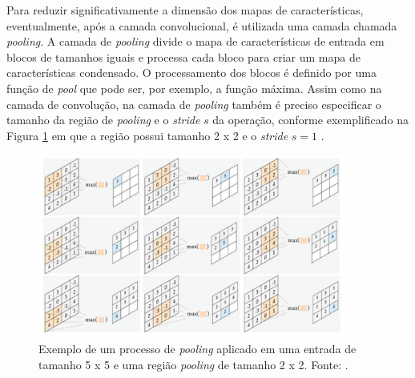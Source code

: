Para reduzir significativamente a dimensão dos mapas de características, eventualmente, após a camada convolucional, é utilizada uma camada chamada \textit{pooling}. A camada de \textit{pooling} divide o mapa de características de entrada em blocos de tamanhos iguais e processa cada bloco para criar um mapa de características condensado. O processamento dos blocos é definido por uma função de \textit{pool} que pode ser, por exemplo, a função máxima. Assim como na camada de convolução, na camada de \textit{pooling} também é preciso especificar o tamanho da região de \textit{pooling} e o \textit{stride} $s$ da operação, conforme exemplificado na Figura \ref{img:pooling} em que a região possui tamanho 2 x 2 e o \textit{stride} $s=1$ \cite{ref:buduma,ref:khan}.

\begin{figure}[!ht]
	\centering
	\includegraphics[width=0.9\textwidth]{./img/pooling}
	\caption{Exemplo de um processo de \textit{pooling} aplicado em uma entrada de tamanho 5 x 5 e uma região \textit{pooling} de tamanho 2 x 2. Fonte: \cite{ref:khan}.}
	\label{img:pooling}
\end{figure}